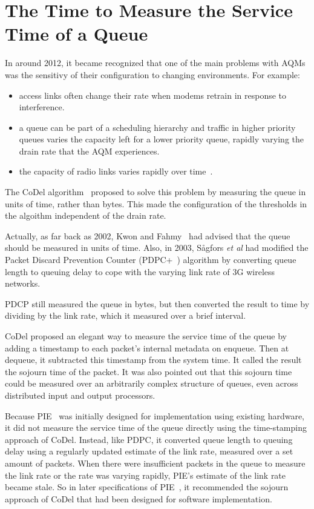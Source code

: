 \section{The Time to Measure the Service Time of a Queue}\label{sec:svc_time}

In around 2012, it became recognized that one of the main problems with AQMs was the sensitivy of their configuration to changing environments. For example:
\begin{itemize}
	\item access links often change their rate when modems retrain in response to interference. 
	\item a queue can be part of a scheduling hierarchy and traffic in higher priority queues varies the capacity left for a lower priority queue, rapidly varying the drain rate that the AQM experiences.
	\item the capacity of radio links varies rapidly over time~\cite{McGregor10:Minstrel_TR}.
\end{itemize}

The CoDel algorithm~\cite{Nichols12:CoDel} proposed to solve this problem by measuring the queue in units of time, rather than bytes. This made the configuration of the thresholds in the algoithm independent of the drain rate.

Actually, as far back as 2002, 
Kwon and Fahmy~\cite{Kwon02:Load_v_Queue_AQM} had advised that the queue should 
be measured in units of time. Also, in 2003, S{\aa}gfors \emph{et al} had 
modified the Packet Discard Prevention Counter (PDPC+~\cite{Sagfors03:PDPC_vary}) 
algorithm by converting queue length to queuing delay to cope with the varying 
link rate of 3G wireless networks.

PDCP still measured the queue in bytes, but then converted the result to time by dividing by the link rate, which it measured over a brief interval. 

CoDel proposed an elegant way to measure the service time of the queue by adding a timestamp to each packet's internal metadata on enqueue. Then at dequeue, it subtracted this timestamp from the system time. It called the result the sojourn time of the packet. It was also pointed out that this sojourn time could be measured over an arbitrarily complex structure of queues, even across distributed input and output processors.

Because PIE~\cite{Pan13:PIE} was initially designed for implementation using existing hardware, it did not measure the service time of the queue directly using the time-stamping approach of CoDel.
Instead, like PDPC, it converted queue length to queuing delay using a regularly updated 
estimate of the link rate, measured over a set amount of packets. When there were insufficient packets in the queue to measure the link rate or the rate was varying rapidly, PIE's estimate of the link rate became stale. So in later specifications of PIE~\cite{Pan17:PIE}, it recommended the sojourn approach of CoDel that had been designed for software implementation.

